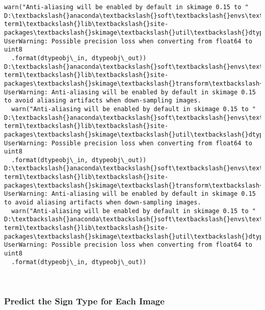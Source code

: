 \documentclass[11pt]{article}
\begin{document}
\begin{Verbatim}[commandchars=\\\{\}]
  warn("Anti-aliasing will be enabled by default in skimage 0.15 to "
D:\textbackslash{}anaconda\textbackslash{}soft\textbackslash{}envs\textbackslash{}carnd-term1\textbackslash{}lib\textbackslash{}site-packages\textbackslash{}skimage\textbackslash{}util\textbackslash{}dtype.py:130: UserWarning: Possible precision loss when converting from float64 to uint8
  .format(dtypeobj\_in, dtypeobj\_out))
D:\textbackslash{}anaconda\textbackslash{}soft\textbackslash{}envs\textbackslash{}carnd-term1\textbackslash{}lib\textbackslash{}site-packages\textbackslash{}skimage\textbackslash{}transform\textbackslash{}\_warps.py:110: UserWarning: Anti-aliasing will be enabled by default in skimage 0.15 to avoid aliasing artifacts when down-sampling images.
  warn("Anti-aliasing will be enabled by default in skimage 0.15 to "
D:\textbackslash{}anaconda\textbackslash{}soft\textbackslash{}envs\textbackslash{}carnd-term1\textbackslash{}lib\textbackslash{}site-packages\textbackslash{}skimage\textbackslash{}util\textbackslash{}dtype.py:130: UserWarning: Possible precision loss when converting from float64 to uint8
  .format(dtypeobj\_in, dtypeobj\_out))
D:\textbackslash{}anaconda\textbackslash{}soft\textbackslash{}envs\textbackslash{}carnd-term1\textbackslash{}lib\textbackslash{}site-packages\textbackslash{}skimage\textbackslash{}transform\textbackslash{}\_warps.py:110: UserWarning: Anti-aliasing will be enabled by default in skimage 0.15 to avoid aliasing artifacts when down-sampling images.
  warn("Anti-aliasing will be enabled by default in skimage 0.15 to "
D:\textbackslash{}anaconda\textbackslash{}soft\textbackslash{}envs\textbackslash{}carnd-term1\textbackslash{}lib\textbackslash{}site-packages\textbackslash{}skimage\textbackslash{}util\textbackslash{}dtype.py:130: UserWarning: Possible precision loss when converting from float64 to uint8
  .format(dtypeobj\_in, dtypeobj\_out))

    \end{Verbatim}

    \begin{center}
    \end{center}
    { \hspace*{\fill} \\}
    
    \hypertarget{predict-the-sign-type-for-each-image}{%
\subsubsection{Predict the Sign Type for Each
Image}\label{predict-the-sign-type-for-each-image}}
\end{document}
